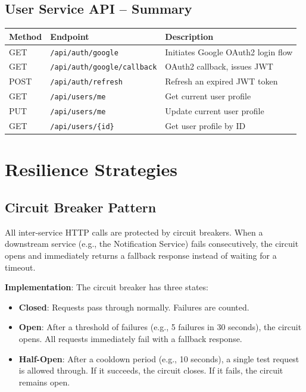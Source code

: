 \documentclass[12pt,a4paper]{article}
\begin{document}
\subsection{User Service API -- Summary}

\begin{longtable}{@{}p{1.8cm}p{5.5cm}p{6.5cm}@{}}
\toprule
\textbf{Method} & \textbf{Endpoint} & \textbf{Description} \\
\midrule
\endhead
GET & \texttt{/api/auth/google} & Initiates Google OAuth2 login flow \\
\midrule
GET & \texttt{/api/auth/google/callback} & OAuth2 callback, issues JWT \\
\midrule
POST & \texttt{/api/auth/refresh} & Refresh an expired JWT token \\
\midrule
GET & \texttt{/api/users/me} & Get current user profile \\
\midrule
PUT & \texttt{/api/users/me} & Update current user profile \\
\midrule
GET & \texttt{/api/users/\{id\}} & Get user profile by ID \\
\bottomrule
\end{longtable}

\newpage

\section{Resilience Strategies}

\subsection{Circuit Breaker Pattern}

All inter-service HTTP calls are protected by circuit breakers. When a downstream service (e.g., the Notification Service) fails consecutively, the circuit opens and immediately returns a fallback response instead of waiting for a timeout.

\textbf{Implementation}: The circuit breaker has three states:
\begin{itemize}
    \item \textbf{Closed}: Requests pass through normally. Failures are counted.
    \item \textbf{Open}: After a threshold of failures (e.g., 5 failures in 30 seconds), the circuit opens. All requests immediately fail with a fallback response.
    \item \textbf{Half-Open}: After a cooldown period (e.g., 10 seconds), a single test request is allowed through. If it succeeds, the circuit closes. If it fails, the circuit remains open.
\end{itemize}
\end{document}
